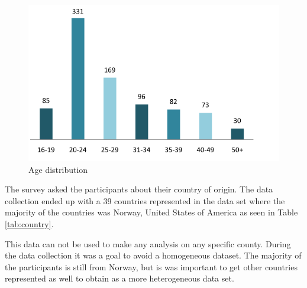     \begin{figure}[H]
      \centering
      \includegraphics[scale=0.8]{pics/analysis/AgeDist.png}
      \caption{Age distribution}
      \label{fig:ageDistribution}
    \end{figure}

    The survey asked the participants about their country of origin. The data collection ended up with a 39 countries represented in the data set where the majority of the countries was Norway, United States of America as seen in Table \ref{tab:country}.

    This data can not be used to make any analysis on any specific county. During the data collection it was a goal to avoid a homogeneous dataset. The majority of the participants is still from Norway, but is was important to get other countries represented as well to obtain as a more heterogeneous data set. 


